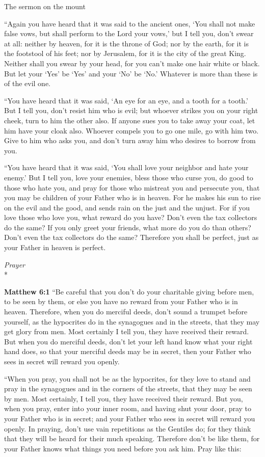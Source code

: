 \documentclass[10pt,twoside]{article} %
\newcommand{\quotesize}{\normalsize{}}
\newenvironment{quotetext}{\begingroup\quotesize}{\endgroup}
\newcommand{\intex}[1]{\index[texts]{#1}}
\newcommand{\bible}[2]{\begin{quotetext}\textbf{#1}\intex{#1} #2\end{quotetext}}
\newcommand{\matthew}[2]{\bible{Matthew #1}{#2}}
\newcommand{\subhead}[1]{\emph{#1}\\*}
\begin{document}
\begin{section}{The sermon on the mount}
{   ``Again you have heard that it was said to the ancient ones, `You shall not make false vows, but shall perform to the Lord your vows,'    but I tell you, don't swear at all: neither by heaven, for it is the throne of God;    nor by the earth, for it is the footstool of his feet; nor by Jerusalem, for it is the city of the great King.    Neither shall you swear by your head, for you can't make one hair white or black.    But let your `Yes' be `Yes' and your `No' be `No.' Whatever is more than these is of the evil one.

   ``You have heard that it was said, `An eye for an eye, and a tooth for a tooth.'    But I tell you, don't resist him who is evil; but whoever strikes you on your right cheek, turn to him the other also.    If anyone sues you to take away your coat, let him have your cloak also.    Whoever compels you to go one mile, go with him two.    Give to him who asks you, and don't turn away him who desires to borrow from you.

   ``You have heard that it was said, `You shall love your neighbor  and hate your enemy.'    But I tell you, love your enemies, bless those who curse you, do good to those who hate you, and pray for those who mistreat you and persecute you,    that you may be children of your Father who is in heaven. For he makes his sun to rise on the evil and the good, and sends rain on the just and the unjust.    For if you love those who love you, what reward do you have? Don't even the tax collectors do the same?    If you only greet your friends, what more do you do than others? Don't even the tax collectors do the same?    Therefore you shall be perfect, just as your Father in heaven is perfect.
}

\subhead{Prayer}

\matthew{6:1}{
    ``Be careful that you don't do your charitable giving before men, to be seen by them, or else you have no reward from your Father who is in heaven.    Therefore, when you do merciful deeds, don't sound a trumpet before yourself, as the hypocrites do in the synagogues and in the streets, that they may get glory from men. Most certainly I tell you, they have received their reward.    But when you do merciful deeds, don't let your left hand know what your right hand does,    so that your merciful deeds may be in secret, then your Father who sees in secret will reward you openly.

   ``When you pray, you shall not be as the hypocrites, for they love to stand and pray in the synagogues and in the corners of the streets, that they may be seen by men. Most certainly, I tell you, they have received their reward.    But you, when you pray, enter into your inner room, and having shut your door, pray to your Father who is in secret; and your Father who sees in secret will reward you openly.    In praying, don't use vain repetitions as the Gentiles do; for they think that they will be heard for their much speaking.    Therefore don't be like them, for your Father knows what things you need before you ask him.    Pray like this:
}


\end{section}
\end{document}
